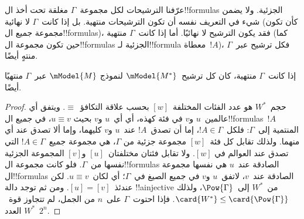 \documentclass[../../../include/open-logic-section]{subfiles}
\begin{document}


عرّفنا الترشيحات لكل مجموعة~$\Gamma$ مغلقة تحت أخذ ال!!{formula}s
الجزئية. ولا يضمن شيء في التعريف نفسه أن تكون الترشيحات منتهية. بل إذا
كانت~$\Gamma$ لا نهائية (كأن تكون مجموعة جميع ال!!{formula}s)، فقد يكون
الترشيح لا نهائيًا. أما إذا كانت~$\Gamma$ منتهية (كما حين تكون مجموعة
ال!!{formula}s الجزئية لـ!!{formula} معطاة~$!A$)، فكل ترشيح عبر~$\Gamma$ منتهٍ
أيضًا.

\begin{prop}
  إذا كانت~$\Gamma$ منتهية، كان كل ترشيح~$\mModel{M^*}$ لنموذج
  $\mModel{M}$ عبر~$\Gamma$ منتهيًا أيضًا.
\end{prop}

\begin{proof}
  حجم~$W^*$ هو عدد الفئات المختلفة~$[w]$ بحسب علاقة التكافؤ~$\equiv$.
  ويتفق أي عالمين~$u$ و$v$ في فئة كهذه، أي أي~$u$ و$v$ بحيث
  $u \equiv v$، في جميع ال!!{formula}s~$!A$ المنتمية إلى~$\Gamma$:
  فلكل~$!A \in \Gamma$، إما أن تصدق~$!A$ عند~$u$ و$v$ كليهما، وإما
  ألا تصدق عند أي منهما. ولذلك تقابل كل فئة~$[w]$ مجموعة جزئية من
  $\Gamma$، هي مجموعة جميع~$!A \in \Gamma$ التي تصدق عند العوالم في
  $[w]$. ولا تقابل فئتان مختلفتان~$[u]$ و$[v]$ المجموعة الجزئية نفسها
  من~$\Gamma$. فلو كانت مجموعة ال!!{formula}s الصادقة عند~$u$ هي نفسها
  مجموعة ال!!{formula}s الصادقة عند~$v$، لاتفق~$u$ و$v$ في جميع الصيغ
  في~$\Gamma$؛ أي لكان~$u \equiv v$. لكن عندئذ~$[u]=[v]$. ومن ثم توجد
  دالة !!a{injective} من~$W^*$ إلى~$\Pow{\Gamma}$، ولذلك
  $\card{W^*} \le \card{\Pow{\Gamma}}$. فإذا احتوت~$\Gamma$ على~$n$
  من الجمل، لم تتجاوز قوة~$W^*$ العدد~$2^n$.
\end{proof}
\end{document}
